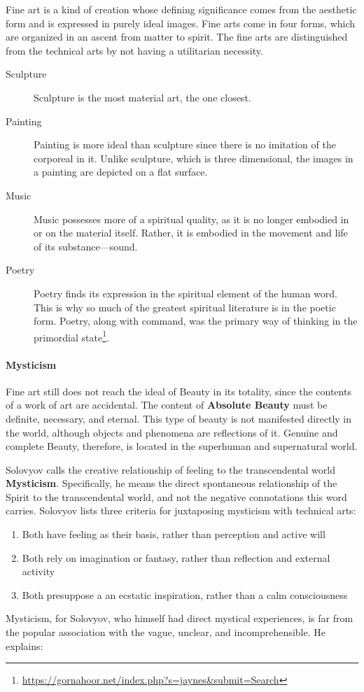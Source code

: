 Fine art is a kind of creation whose defining significance comes from the aesthetic form and is expressed in purely ideal images. Fine arts come in four forms, which are organized in an ascent from matter to spirit. The fine arts are distinguished from the technical arts by not having a utilitarian necessity.

\begin{description}
\item[Sculpture ] Sculpture is the most material art, the one closest. 
\item[Painting ] Painting is more ideal than sculpture since there is no imitation of the corporeal in it. Unlike sculpture, which is three dimensional, the images in a painting are depicted on a flat surface. 
\item[Music ] Music possesses more of a spiritual quality, as it is no longer embodied in or on the material itself. Rather, it is embodied in the movement and life of its substance—sound. 
\item[Poetry ] Poetry finds its expression in the spiritual element of the human word. This is why so much of the greatest spiritual literature is in the poetic form. Poetry, along with command, was the primary way of thinking in the primordial state\footnote{\url{https://gornahoor.net/index.php?s=jaynes\&submit=Search}}. 
\end{description}

\paragraph{Mysticism}
Fine art still does not reach the ideal of Beauty in its totality, since the contents of a work of art are accidental. The content of \textbf{Absolute Beauty} must be definite, necessary, and eternal. This type of beauty is not manifested directly in the world, although objects and phenomena are reflections of it. Genuine and complete Beauty, therefore, is located in the superhuman and supernatural world.

Solovyov calls the creative relationship of feeling to the transcendental world \textbf{Mysticism}. Specifically, he means the direct spontaneous relationship of the Spirit to the transcendental world, and not the negative connotations this word carries. Solovyov lists three criteria for juxtaposing mysticism with technical arts:

\begin{enumerate}
\item Both have feeling as their basis, rather than perception and active will 
\item Both rely on imagination or fantasy, rather than reflection and external activity 
\item Both presuppose a an ecstatic inspiration, rather than a calm consciousness 
\end{enumerate}
Mysticism, for Solovyov, who himself had direct mystical experiences, is far from the popular association with the vague, unclear, and incomprehensible. He explains:

